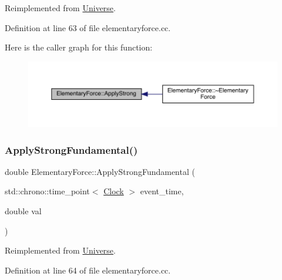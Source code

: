 Reimplemented from \hyperlink{class_universe_a906a88b37f10bfa630bef49dfd0e907a}{Universe}.



Definition at line 63 of file elementaryforce.\+cc.

Here is the caller graph for this function\+:
\nopagebreak
\begin{figure}[H]
\begin{center}
\leavevmode
\includegraphics[width=350pt]{class_elementary_force_a8a16bff6b5df2b0ff918262bf6376ade_icgraph}
\end{center}
\end{figure}
\mbox{\label{class_elementary_force_a80f1977e777aa0c8cce2124b666e6446}} 
\subsubsection{\texorpdfstring{Apply\+Strong\+Fundamental()}{ApplyStrongFundamental()}}
{\footnotesize\ttfamily double Elementary\+Force\+::\+Apply\+Strong\+Fundamental (\begin{DoxyParamCaption}\item[{std\+::chrono\+::time\+\_\+point$<$ \hyperlink{universe_8h_a0ef8d951d1ca5ab3cfaf7ab4c7a6fd80}{Clock} $>$}]{event\+\_\+time,  }\item[{double}]{val }\end{DoxyParamCaption})\hspace{0.3cm}{\ttfamily [virtual]}}



Reimplemented from \hyperlink{class_universe_a62789bcff84bd750b0366004381e2fdd}{Universe}.



Definition at line 64 of file elementaryforce.\+cc.

